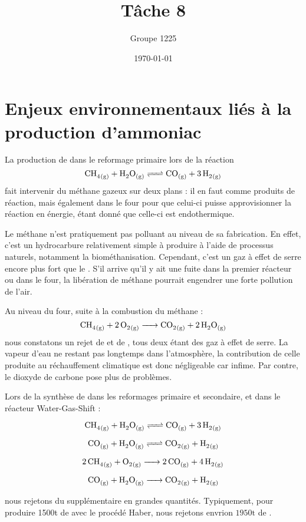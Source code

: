 \documentclass[a4paper, oneside, 12pt]{article}
\title{Tâche 8}
\author{Groupe 1225}
\date{\today}
\begin{document}
\maketitle

\section*{Enjeux environnementaux liés à la production d'ammoniac}

La production de  dans le reformage primaire lors de la réaction
\[ \ce{CH4_{(g)} + H2O_{(g)} <=> CO_{(g)} + 3 \, H2_{(g)}} \]
fait intervenir du méthane gazeux sur deux plans : il en faut comme produits de réaction,
mais également dans le four pour que celui-ci puisse approvisionner la réaction en énergie,
étant donné que celle-ci est endothermique. 

Le méthane n'est pratiquement pas polluant au niveau de sa fabrication. 
En effet, c'est un hydrocarbure relativement simple à produire à l'aide 
de processus naturels, notamment la biométhanisation. 
Cependant, c'est un gaz à effet de serre encore plus fort que le .
S'il arrive qu'il y ait une fuite dans la premier réacteur ou dans le four, 
la libération de méthane pourrait engendrer une forte pollution de l'air.

Au niveau du four, suite à la combustion du méthane : 
\[ \ce{CH4_{(g)} + 2 \, O2_{(g)} -> CO2_{(g)} + 2 \, H2O_{(g)}} \] 
nous constatons un rejet de  et de , 
tous deux étant des gaz à effet de serre. 
La vapeur d'eau ne restant pas longtemps dans l'atmosphère,
la contribution de celle produite au réchauffement climatique est donc négligeable car infime. \cite{gaz_effet_de_serre}
Par contre, le dioxyde de carbone pose plus de problèmes. 

Lors de la synthèse de  dans les reformages primaire et secondaire, 
et dans le réacteur Water-Gas-Shift : 

\[ \ce{CH4_{(g)} + H2O_{(g)} <=> CO_{(g)} + 3 \, H2_{(g)}} \]

\[ \ce{CO_{(g)} + H2O_{(g)} <=> CO2_{(g)} + H2_{(g)}} \]

\[ \ce{2 \, CH4_{(g)} + O2_{(g)} -> {2} \, CO_{(g)} + 4 \, H2_{(g)}} \]
	
\[ \ce{CO_{(g)} + H2O_{(g)} -> CO2_{(g)} + H2_{(g)}} \]

nous rejetons du  supplémentaire en grandes quantités. 
Typiquement, pour produire 1500t de  avec le procédé Haber, 
nous rejetons envrion $1950\si{\tonne}$ de .
\end{document}

